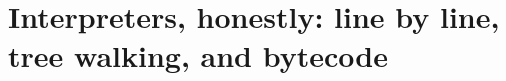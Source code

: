 \chapter{Interpreters, honestly: line by line, tree walking, and bytecode}
\label{ch:interpreters-honestly-line-by-line-tree}

